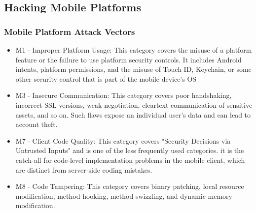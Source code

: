 \subsection{Hacking Mobile Platforms}
\subsubsection{Mobile Platform Attack Vectors}
\begin{itemize}
    \item M1 - Improper Platform Usage: This category covers the misuse of a platform feature or the failure to use platform security controls. It includes Android intents, platform permissions, and the misuse of Touch ID, Keychain, or some other security control that is part of the mobile device's OS
    \item M3 - Insecure Communication: This category covers poor handshaking, incorrect SSL versions, weak negotiation, cleartext communication of sensitive assets, and so on. Such flaws expose an individual user's data and can lead to account theft.
    \item M7 - Client Code Quality: This category covers "Security Decisions via Untrusted Inputs" and is one of the less frequently used categories. it is the catch-all for code-level implementation problems in the mobile client, which are distinct from server-side coding mistakes.
    \item M8 - Code Tampering: This category covers binary patching, local resource modification, method hooking, method swizzling, and dynamic memory modification.
\end{itemize}
